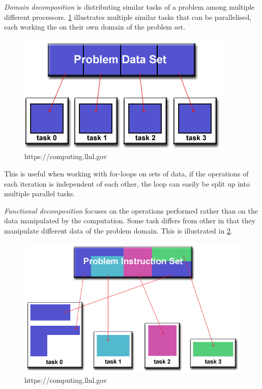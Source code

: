 \emph{Domain decomposition} is distributing similar tasks of a problem among multiple different processors. \cref{dom} illustrates multiple similar tasks that can be parallelised, each working the on their own domain of the problem set.

\begin{figure}[htbp]\label{dom}
\includegraphics[width=\textwidth]{Analysis/Supercomputing/domain_decomp.png}
\caption{https://computing.llnl.gov}
\end{figure}

This is useful when working with for-loops on sets of data, if the operations of each iteration is independent of each other, the loop can easily be split up into multiple parallel tasks.

\emph{Functional decomposition} focuses on the operations performed rather than on the data manipulated by the computation. Some task differs from other in that they manipulate different data of the problem domain. This is illustrated in \cref{fun}.

\begin{figure}[htbp]\label{fun}
\includegraphics[width=\textwidth]{Analysis/Supercomputing/functional_decomp.png}
\caption{https://computing.llnl.gov}
\end{figure}
